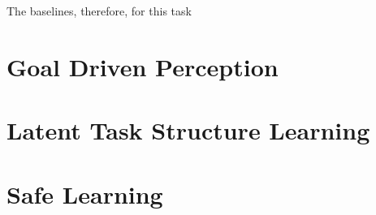 \documentclass{article}
\begin{document}
The baselines, therefore, for this task 


\section{Goal Driven Perception}

\section{Latent Task Structure Learning}

\section{Safe Learning}
\end{document}
